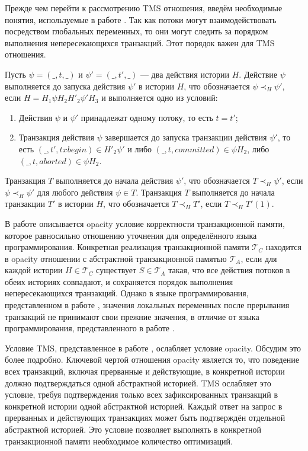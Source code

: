 Прежде чем перейти к рассмотрению TMS отношения, введём необходимые понятия, используемые в работе \cite{tms_article}. Так как потоки могут взаимодействовать посредством глобальных переменных, то они могут следить за порядком выполнения непересекающихся транзакций. Этот порядок важен для TMS отношения.

\begin{mydefinition}
Пусть $\psi = (\_, t, \_)$ и $\psi' = (\_, t', \_)$ --- два действия истории $H$. Действие $\psi$ выполняется до запуска действия $\psi'$ в истории $H$, что обозначается $\psi \prec_H \psi'$, если $H = H_1\psi{H_2}H'_2\psi'{H_3}$ и выполняется одно из условий:  
\begin{enumerate}[label = (\roman*)]
\item Действия $\psi$ и $\psi'$ принадлежат одному потоку, то есть $t = t'$;
\item Транзакция действия $\psi$ завершается до запуска транзакции действия $\psi'$, то есть $(\_, t', txbegin) \in H'_2\psi'$ и либо $(\_, t, committed) \in \psi{H_2}$, либо $(\_, t, aborted) \in \psi{H_2}$. 
\end{enumerate}
Транзакция $T$ выполняется до начала действия $\psi'$, что обозначается $T \prec_H \psi'$, если $\psi \prec_H \psi'$ для любого действия $\psi \in T$. 
Транзакция $T$ выполняется до начала транзакции $T'$ в истории $H$, что обозначается $T \prec_H T'$, если $T \prec_H T'(1)$.
\end{mydefinition}

В работе \cite{opacity_article} описывается opacity условие корректности транзакционной памяти, которое равносильно отношению уточнения для определённого языка программирования. Конкретная реализация транзакционной памяти $\mathcal{T}_C$ находится в opacity отношении с абстрактной транзакционной памятью $\mathcal{T}_A$, если для каждой истории $H \in \mathcal{T}_C$ существует $S \in \mathcal{T}_A$ такая, что все действия потоков в обеих историях совпадают, и сохраняется порядок выполнения непересекающихся транзакций. Однако в языке программирования, представленном в работе \cite{opacity_article}, значения локальных переменных после прерывания транзакций не принимают свои прежние значения, в отличие от языка программирования, представленного в работе \cite{tms_article}. 

Условие TMS, представленное в работе \cite{tms_article}, ослабляет условие opacity. Обсудим это более подробно. Ключевой чертой отношения opacity является то, что поведение всех транзакций, включая прерванные и действующие, в конкретной истории должно подтверждаться одной абстрактной историей. TMS ослабляет это условие, требуя подтверждения только всех зафиксированных транзакций в конкретной истории одной абстрактной историей. Каждый ответ на запрос в прерванных и действующих транзакциях может быть подтверждён отдельной абстрактной историей. Это условие позволяет выполнять в конкретной транзакционной памяти необходимое количество оптимизаций. 


